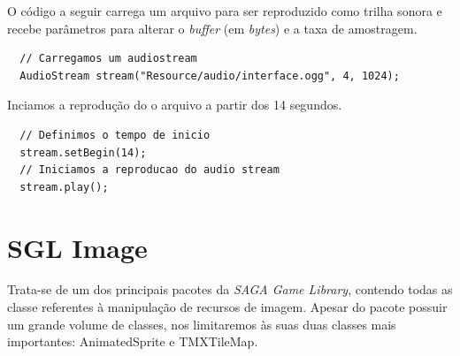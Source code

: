 %
%
\par
O código a seguir carrega um arquivo para ser reproduzido como trilha sonora e recebe parâmetros para alterar o \textit{buffer} (em \textit{bytes}) e a taxa de amostragem.
%
\begin{lstlisting}
  // Carregamos um audiostream
  AudioStream stream("Resource/audio/interface.ogg", 4, 1024);
\end{lstlisting}
%
\par 
Inciamos a reprodução do o arquivo a partir dos 14 segundos.
%
\begin{lstlisting}
  // Definimos o tempo de inicio
  stream.setBegin(14);
  // Iniciamos a reproducao do audio stream
  stream.play();
\end{lstlisting}
%
%
%
\section{SGL Image}
%
Trata-se de um dos principais pacotes da \textit{SAGA Game Library}, contendo todas as classe referentes à manipulação de recursos de imagem. Apesar do pacote possuir um grande volume de classes, nos limitaremos às suas duas classes mais importantes: AnimatedSprite e TMXTileMap.
%
%
%
